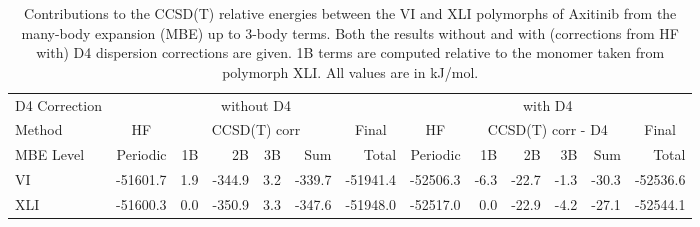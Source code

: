 \begin{table}[h]

\caption{\label{tab:axitinib_mbe_contributions}Contributions to the CCSD(T) relative energies between the VI and XLI polymorphs of Axitinib from the many-body expansion (MBE) up to 3-body terms. Both the results without and with (corrections from HF with) D4 dispersion corrections are given. 1B terms are computed relative to the monomer taken from polymorph XLI. All values are in kJ/mol.}
\begin{tabular}{lrrrrrrrrrrrr}
\toprule
D4 Correction & \multicolumn{6}{c}{without D4} & \multicolumn{6}{c}{with D4} \\ \cmidrule(lr){2-7} \cmidrule(lr){8-13} 
Method & \multicolumn{1}{c}{HF} & \multicolumn{4}{c}{CCSD(T) corr} & \multicolumn{1}{c}{Final} & \multicolumn{1}{c}{HF} & \multicolumn{4}{c}{CCSD(T) corr - D4} & \multicolumn{1}{c}{Final} \\ \cmidrule(lr){2-2} \cmidrule(lr){3-6} \cmidrule(lr){7-7} \cmidrule(lr){8-8} \cmidrule(lr){9-12} \cmidrule(lr){13-13}
MBE Level & Periodic & 1B & 2B & 3B & Sum & Total & Periodic & 1B & 2B & 3B & Sum & Total \\
\midrule
VI & -51601.7 & 1.9 & -344.9 & 3.2 & -339.7 & -51941.4 & -52506.3 & -6.3 & -22.7 & -1.3 & -30.3 & -52536.6 \\
XLI & -51600.3 & 0.0 & -350.9 & 3.3 & -347.6 & -51948.0 & -52517.0 & 0.0 & -22.9 & -4.2 & -27.1 & -52544.1 \\
\bottomrule
\end{tabular}

\end{table}